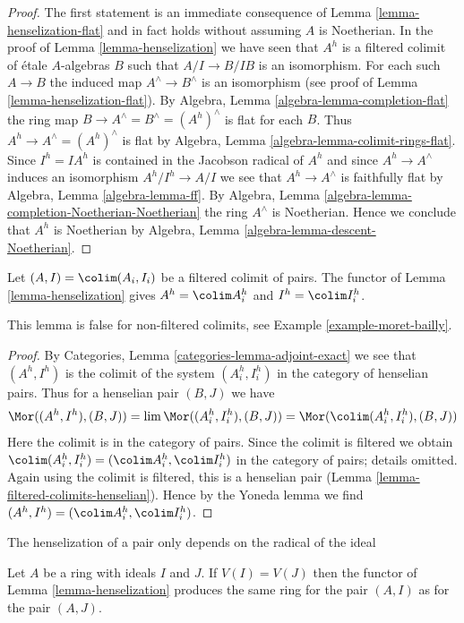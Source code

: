 \begin{proof}
The first statement is an immediate consequence of
Lemma \ref{lemma-henselization-flat}
and in fact holds without assuming $A$ is Noetherian.
In the proof of Lemma \ref{lemma-henselization} we have seen that
$A^h$ is a filtered colimit of \'etale $A$-algebras $B$ such that
$A/I \to B/IB$ is an isomorphism. For each such $A \to B$
the induced map $A^\wedge \to B^\wedge$ is an isomorphism
(see proof of Lemma \ref{lemma-henselization-flat}).
By Algebra, Lemma \ref{algebra-lemma-completion-flat} the ring map
$B \to A^\wedge = B^\wedge = (A^h)^\wedge$ is flat for each $B$.
Thus $A^h \to A^\wedge = (A^h)^\wedge$ is flat by
Algebra, Lemma \ref{algebra-lemma-colimit-rings-flat}.
Since $I^h = IA^h$ is contained in the Jacobson radical of $A^h$
and since $A^h \to A^\wedge$ induces an isomorphism $A^h/I^h \to A/I$
we see that $A^h \to A^\wedge$ is faithfully flat by
Algebra, Lemma \ref{algebra-lemma-ff}.
By Algebra, Lemma \ref{algebra-lemma-completion-Noetherian-Noetherian}
the ring $A^\wedge$ is Noetherian.
Hence we conclude that $A^h$ is Noetherian by
Algebra, Lemma \ref{algebra-lemma-descent-Noetherian}.
\end{proof}

\begin{lemma}
\label{lemma-henselization-colimit}
Let $(A, I) = \colim (A_i, I_i)$ be a filtered colimit of pairs. The functor of
Lemma \ref{lemma-henselization} gives
$A^h = \colim A_i^h$ and $I^h = \colim I_i^h$.
\end{lemma}

\noindent
This lemma is false for non-filtered colimits, see
Example \ref{example-moret-bailly}.

\begin{proof}
By Categories, Lemma \ref{categories-lemma-adjoint-exact}
we see that $(A^h, I^h)$ is the colimit of the system $(A_i^h, I_i^h)$
in the category of henselian pairs. Thus for a henselian pair $(B, J)$
we have
$$
\Mor((A^h, I^h), (B, J)) =
\lim \Mor((A_i^h, I_i^h), (B, J)) =
\Mor(\colim (A_i^h, I_i^h), (B, J))
$$
Here the colimit is in the category of pairs. Since the colimit is
filtered we obtain $\colim (A_i^h, I_i^h) = (\colim A_i^h, \colim I_i^h)$
in the category of pairs; details omitted. Again using the colimit is filtered,
this is a henselian pair (Lemma \ref{lemma-filtered-colimits-henselian}).
Hence by the Yoneda lemma we
find $(A^h, I^h) = (\colim A_i^h, \colim I_i^h)$.
\end{proof}

\begin{lemma}
\label{lemma-henselization-change-ideal}
\begin{slogan}
The henselization of a pair only depends on the radical of the ideal
\end{slogan}
Let $A$ be a ring with ideals $I$ and $J$. If $V(I) = V(J)$ then the functor
of Lemma \ref{lemma-henselization} produces the same ring for the pair
$(A, I)$ as for the pair $(A, J)$.
\end{lemma}

